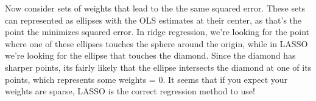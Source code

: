 \documentclass[10pt]{article}
\begin{document}
Now consider sets of weights that lead to the the same squared error. These sets can represented as ellipses with the OLS estimates at their center, as that's the point the minimizes squared error. In ridge regression, we're looking for the point where one of these ellipses touches the sphere around the origin, while in LASSO we're looking for the ellipse that touches the diamond. Since the diamond has sharper points, its fairly likely that the ellipse intersects the diamond at one of its points, which represents some weights = 0. It seems that if you expect your weights are sparse, LASSO is the correct regression method to use!

	
\end{document}
